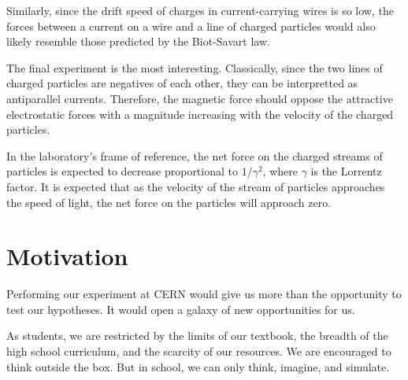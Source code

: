 \documentclass[12pt,letterpaper]{article}
\begin{document}
Similarly, since the drift speed of charges in current-carrying wires is so low, the forces between a current on a wire and a line of charged particles would also likely resemble those predicted by the Biot-Savart law.

The final experiment is the most interesting. Classically, since the two lines of charged particles are negatives of each other, they can be interpretted as antiparallel currents. Therefore, the magnetic force should oppose the attractive electrostatic forces with a magnitude increasing with the velocity of the charged particles.

In the laboratory's frame of reference, the net force on the charged streams of particles is expected to decrease proportional to $1/\gamma^2$, where $\gamma$ is the Lorrentz factor. It is expected that as the velocity of the stream of particles approaches the speed of light, the net force on the particles will approach zero.


\section{Motivation}
Performing our experiment at CERN would give us more than the opportunity to test our hypotheses. It would open a galaxy of new opportunities for us.

As students, we are restricted by the limits of our textbook, the breadth of the high school curriculum, and the scarcity of our resources. We are encouraged to think outside the box. But in school, we can only think, imagine, and simulate.
\end{document}
